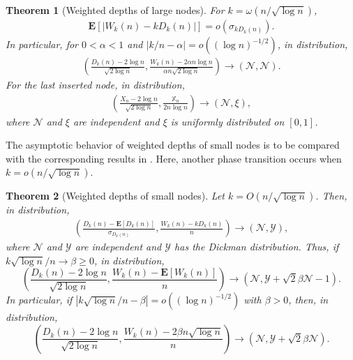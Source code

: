 \documentclass{amsart}       %
\newcommand{\sN}{\mathcal N}
\newcommand{\sY}{\mathcal Y}
\newcommand{\E}[1]{\ensuremath{\mathbf{E} \left[#1 \right]}}
\newtheorem{theorem}{Theorem}
\begin{document}
\begin{theorem}[Weighted depths of large nodes] \label{thm_large}
For $k = \omega(n / \sqrt{\log n})$,
\begin{align} \label{diff_WD}
 \E{| W_k(n) - k D_k(n)|} = o(\sigma_{k D_k(n)}).
\end{align}
In particular, for $0 < \alpha < 1$ and  $|k/n - \alpha| = o((\log n)^{-1/2})$, in distribution,
\begin{align} \label{lim_DW_large}
\left(\frac{D_k(n) - 2 \log n}{\sqrt{2 \log n}}, \frac{W_{k}(n) - 2\alpha n \log n}{\alpha n \sqrt{2 \log n}}  \right) \to (\sN,\sN). \end{align}
For the last inserted node, in distribution,
\begin{align} \label{lim_last}
\left(\frac{X_n - 2 \log n}{\sqrt{2 \log n}}, \frac{\mathbb X_n}{2n \log n} \right) \to \left(\sN, \xi \right), \end{align}
where $\sN$ and $\xi$ are independent and $\xi$ is uniformly distributed on $[0,1]$.
\end{theorem}
The asymptotic behavior of weighted depths of small nodes is to be compared with the corresponding results in \cite{kupa07}. Here, another phase transition occurs when $k = o(n / \sqrt{\log n})$.
\begin{theorem}[Weighted depths of small nodes] \label{thm_small}
Let $k = O(n/ \sqrt{\log n})$. Then, in distribution,
\begin{align} \label{lim_small} \left( \frac{D_k(n) - \E{D_k(n)} }{\sigma_{D_k(n)}}, \frac{W_k(n) - k D_k(n)}{n} \right) \to (\sN, \sY), \end{align}
where $\sN$ and $\sY$ are independent and $\sY$ has the Dickman distribution.
Thus, if $k \sqrt{\log n}/n \to \beta \geq 0$, in distribution,
$$\left(\frac{D_k(n) - 2 \log n }{\sqrt{2 \log n}}, \frac{W_{k}(n) - \E{W_k(n)}}{n}  \right) \to (\sN, \sY + \sqrt{2} \beta \sN -1).$$
In particular, if $|k \sqrt{\log n}/n - \beta| = o((\log n)^{-1/2})$ with $\beta > 0$, then, in distribution, 
$$\left(\frac{D_k(n) -  2\log n}{\sqrt{2 \log n}}, \frac{W_{k}(n) - 2 \beta n \sqrt{\log n}}{n}  \right) \to (\sN, \sY + \sqrt{2}\beta \sN).$$
\end{theorem}
\end{document}
